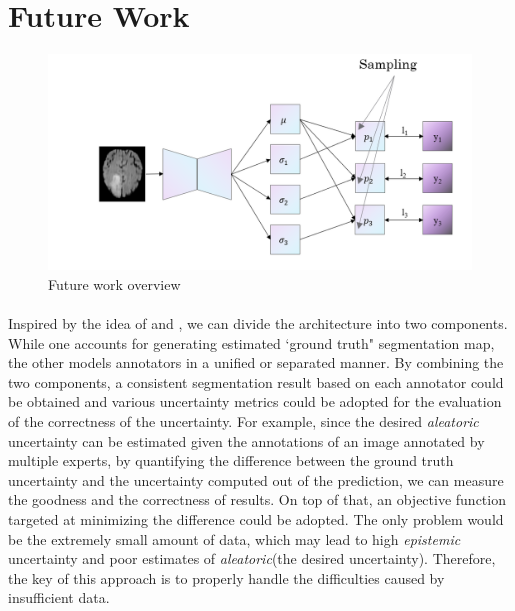 \documentclass[12pt]{extarticle}
\begin{document}
\section{Future Work}
\begin{figure}[ht!]
\centering
\includegraphics[scale=0.3]{fig5.png}
\caption{Future work overview}
\label{future work}
\end{figure}
\paragraph{}
Inspired by the idea of 
\cite{zhang2020disentangling} and \cite{kohl2019probabilistic}, 
we can divide the architecture into two components. 
While one accounts for generating estimated `ground truth" segmentation map,
the other models annotators in a unified or separated manner. By combining 
the two components, a consistent segmentation result based on each annotator 
could be obtained and various uncertainty metrics could be adopted for
the evaluation of the correctness of the uncertainty. For example,
since the desired \textit{aleatoric} uncertainty can be 
estimated given the annotations of an image annotated by multiple experts\cite{qubiq}, 
by quantifying the difference between the ground truth uncertainty and 
the uncertainty computed out of the prediction, we can measure the goodness and the correctness of
results. On top of that, an objective function targeted at 
minimizing the difference could be adopted. The only problem would be the 
extremely small amount of data, which may lead to high \textit{epistemic} uncertainty and 
poor estimates of \textit{aleatoric}(the desired uncertainty). Therefore, the key of this approach 
is to properly handle the difficulties caused by insufficient data.
\paragraph{}




\end{document}
